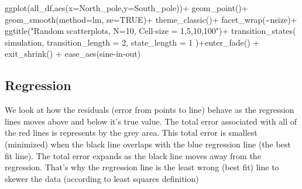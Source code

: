 \documentclass[
  letterpaper,
  DIV=11,
  numbers=noendperiod]{scrreprt}
\newenvironment{Shaded}{\begin{snugshade}}{\end{snugshade}}
\newcommand{\AttributeTok}[1]{\textcolor[rgb]{0.40,0.45,0.13}{#1}}
\newcommand{\ConstantTok}[1]{\textcolor[rgb]{0.56,0.35,0.01}{#1}}
\newcommand{\DecValTok}[1]{\textcolor[rgb]{0.68,0.00,0.00}{#1}}
\newcommand{\FunctionTok}[1]{\textcolor[rgb]{0.28,0.35,0.67}{#1}}
\newcommand{\NormalTok}[1]{\textcolor[rgb]{0.00,0.23,0.31}{#1}}
\newcommand{\SpecialCharTok}[1]{\textcolor[rgb]{0.37,0.37,0.37}{#1}}
\newcommand{\StringTok}[1]{\textcolor[rgb]{0.13,0.47,0.30}{#1}}
\begin{document}
\begin{Shaded}
\begin{Highlighting}[]
\FunctionTok{ggplot}\NormalTok{(all\_df,}\FunctionTok{aes}\NormalTok{(}\AttributeTok{x=}\NormalTok{North\_pole,}\AttributeTok{y=}\NormalTok{South\_pole))}\SpecialCharTok{+}
  \FunctionTok{geom\_point}\NormalTok{()}\SpecialCharTok{+}
  \FunctionTok{geom\_smooth}\NormalTok{(}\AttributeTok{method=}\NormalTok{lm, }\AttributeTok{se=}\ConstantTok{TRUE}\NormalTok{)}\SpecialCharTok{+}
  \FunctionTok{theme\_classic}\NormalTok{()}\SpecialCharTok{+}
  \FunctionTok{facet\_wrap}\NormalTok{(}\SpecialCharTok{\textasciitilde{}}\NormalTok{nsize)}\SpecialCharTok{+}
  \FunctionTok{ggtitle}\NormalTok{(}\StringTok{"Random scatterplots, N=10, Cell{-}size = 1,5,10,100"}\NormalTok{)}\SpecialCharTok{+}
  \FunctionTok{transition\_states}\NormalTok{(}
\NormalTok{    simulation,}
    \AttributeTok{transition\_length =} \DecValTok{2}\NormalTok{,}
    \AttributeTok{state\_length =} \DecValTok{1}
\NormalTok{  )}\SpecialCharTok{+}\FunctionTok{enter\_fade}\NormalTok{() }\SpecialCharTok{+} 
  \FunctionTok{exit\_shrink}\NormalTok{() }\SpecialCharTok{+}
  \FunctionTok{ease\_aes}\NormalTok{(}\StringTok{\textquotesingle{}sine{-}in{-}out\textquotesingle{}}\NormalTok{)}
\end{Highlighting}
\end{Shaded}

\subsection{Regression}\label{regression}

We look at how the residuals (error from points to line) behave as the
regression lines moves above and below it's true value. The total error
associated with all of the red lines is represents by the grey area.
This total error is smallest (minimized) when the black line overlaps
with the blue regression line (the best fit line). The total error
expands as the black line moves away from the regression. That's why the
regression line is the least wrong (best fit) line to skewer the data
(according to least squares definition)
\end{document}
